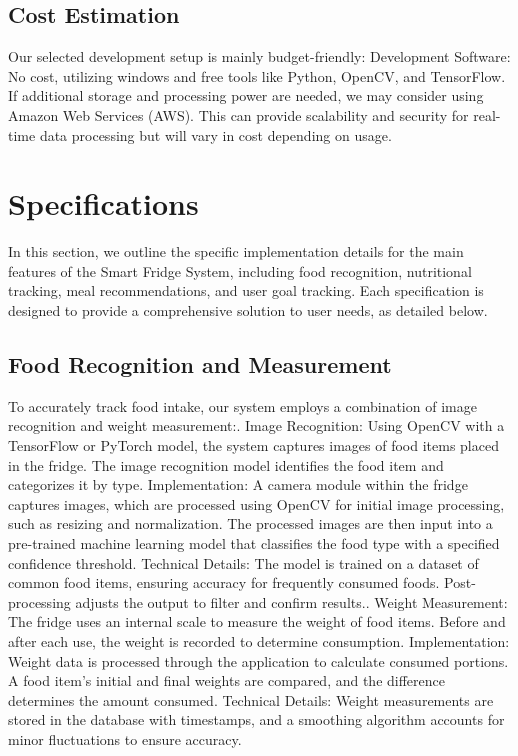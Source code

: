 \documentclass[conference]{IEEEtran}
\begin{document}
\subsection{Cost Estimation}
Our selected development setup is mainly budget-friendly:\newline
Development Software: No cost, utilizing windows and free tools like Python, OpenCV, and TensorFlow.
If additional storage and processing power are needed, we may consider using Amazon Web Services (AWS). This can provide scalability and security for real-time data processing but will vary in cost depending on usage.

\section{Specifications}
In this section, we outline the specific implementation details for the main features of the Smart Fridge System, including food recognition, nutritional tracking, meal recommendations, and user goal tracking. Each specification is designed to provide a comprehensive solution to user needs, as detailed below.
\subsection{Food Recognition and Measurement}
To accurately track food intake, our system employs a combination of image recognition and weight measurement:. Image Recognition:\newline
         Using OpenCV with a TensorFlow or PyTorch model, the system captures images of food items placed in the fridge. The image recognition model identifies the food item and categorizes it by type.\newline
         Implementation: A camera module within the fridge captures images, which are processed using OpenCV for initial image processing, such as resizing and normalization. The processed images are then input into a pre-trained machine learning model that classifies the food type with a specified confidence threshold.\newline
         Technical Details: The model is trained on a dataset of common food items, ensuring accuracy for frequently consumed foods. Post-processing adjusts the output to filter and confirm results.. Weight Measurement:\newline
        The fridge uses an internal scale to measure the weight of food items. Before and after each use, the weight is recorded to determine consumption.\newline
        Implementation: Weight data is processed through the application to calculate consumed portions. A food item’s initial and final weights are compared, and the difference determines the amount consumed.
        Technical Details: Weight measurements are stored in the database with timestamps, and a smoothing algorithm accounts for minor fluctuations to ensure accuracy.\newline
\end{document}
